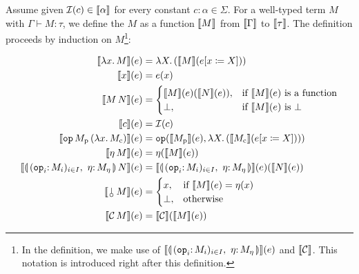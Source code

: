 \begin{definition}\label{def:denotations}
  Assume given $\mathcal{I}(c) \in \llbracket \alpha \rrbracket$ for every constant
  $c : \alpha \in \Sigma$. For a well-typed term $M$ with
  $\Gamma \vdash M : \tau$, we define the 
  $M$ as a function $\llbracket M \rrbracket$ from $\llbracket \Gamma \rrbracket$ to $\llbracket \tau \rrbracket$. The
  definition proceeds by induction on $M$\footnote{In the definition, we
    make use of $\sem{\cibanana}(e)$ and $\llbracket \mathcal{C} \rrbracket$. This notation is
    introduced right after this definition.}:
  
  \begin{align*}
    \sem{\lam{x}{M}}(e) &= \lam{X}{(\sem{M}(\subst{e}{x}{X}))} \\
    \sem{x}(e) &= e(x) \\
    \sem{\ap{M}{N}}(e) &= \begin{cases}
      \sem{M}(e)(\sem{N}(e)),& \text{if $\sem{M}(e)$ is a function} \\
      \bot, & \text{if $\sem{M}(e)$ is $\bot$}
    \end{cases} \\
    \sem{c}(e) &= \II(c) \\
    \sem{\app{\op{op}}{M_\petitp}{(\lam{x}{M_\petitc})}}(e) &=
      \op{op}(\sem{M_\petitp}(e), \lam{X}{(\sem{M_\petitc}({\subst{e}{x}{X}}))}) \\
    \sem{\etaE{M}}(e) &= \eta(\sem{M}(e)) \\
    \sem{\ap{\cibanana}{N}}(e) &= \sem{\cibanana}(e)(\sem{N}(e)) \\
    \sem{\ap{\cherry}{M}}(e) &= \begin{cases}
      x, & \text{if $\sem{M}(e) = \eta(x)$} \\
      \bot, & \text{otherwise} \\
    \end{cases} \\
    \sem{\ap{\CC}{M}}(e) &= \sem{\CC}(\sem{M}(e))
  \end{align*}
\end{definition}

